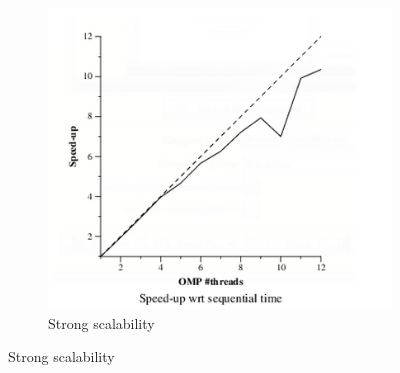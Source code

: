 \documentclass[a4paper,11pt]{article}
\begin{document}
\begin{enumerate}
\begin{figure}[h!]
        \begin{subfigure}[b]{0.65\textwidth}
    			\includegraphics[width=\textwidth]{strong_scalability.png}
    			\caption{Strong scalability}
      \end{subfigure}

     \end{figure}


  	\end{enumerate}
\clearpage
\end{document}
